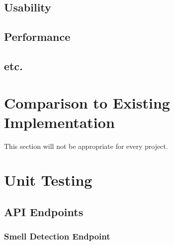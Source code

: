 \documentclass[12pt, titlepage]{article}
\begin{document}
\subsection{Usability}
		
\subsection{Performance}

\subsection{etc.}
	
\section{Comparison to Existing Implementation}	

This section will not be appropriate for every project.

\section{Unit Testing}
\newcommand{\testcount}{\stepcounter{testcase}\thetestcase}
\renewcommand{\arraystretch}{1.2} %

\subsection{API Endpoints}

\subsubsection{Smell Detection Endpoint}
\end{document}

